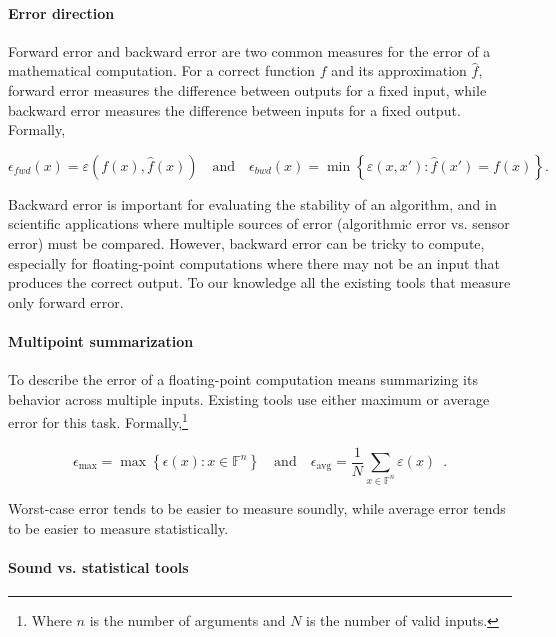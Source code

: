 \documentclass[main.tex]{subfiles}
\begin{document}
\paragraph{Error direction}

Forward error and backward error are two common measures
  for the error of a mathematical computation.
For a correct function $f$ and its approximation $\hat f$,
  forward error measures the difference between outputs for a fixed input,
  while backward error measures the difference between inputs
  for a fixed output.
Formally,

\begin{equation*}
  \epsilon_{fwd}(x) = \varepsilon(f(x), \hat{f}(x))
  \quad \text{and} \quad
  \epsilon_{bwd}(x) =
  \min \left\{ \varepsilon(x, x') : {\hat f}(x') = f(x) \right\}.
\end{equation*}

Backward error is important for evaluating the stability of an algorithm,
  and in scientific applications where multiple sources of error
  (algorithmic error vs. sensor error) must be compared.
However, backward error can be tricky to compute,
  especially for floating-point computations
  where there may not be an input that produces the correct output.
To our knowledge all the existing tools that measure only forward error.

\paragraph{Multipoint summarization}

To describe the error of a floating-point computation
  means summarizing its behavior across multiple inputs.
Existing tools use either maximum or average error for this task.
Formally,\footnote{Where $n$ is the number of arguments and $N$ is the number of valid inputs.}

\begin{equation*}
  \epsilon_{\text{max}} = \max \left\{\epsilon(x) : x \in \mathbb{F}^n\right\}
  \quad \text{and} \quad
  \epsilon_{\text{avg}} = \frac{1}{N} \sum_{x\in \mathbb{F}^n} \varepsilon(x) \enspace .
\end{equation*}

Worst-case error tends to be easier to measure soundly,
  while average error tends to be easier to measure statistically.

\paragraph{Sound vs. statistical tools}
\end{document}
